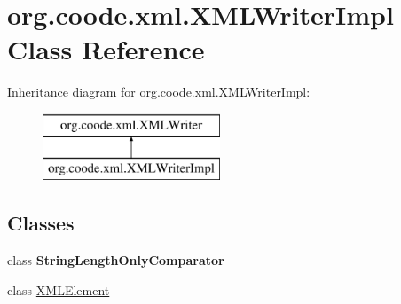 \hypertarget{classorg_1_1coode_1_1xml_1_1_x_m_l_writer_impl}{\section{org.\-coode.\-xml.\-X\-M\-L\-Writer\-Impl Class Reference}
\label{classorg_1_1coode_1_1xml_1_1_x_m_l_writer_impl}
}
Inheritance diagram for org.\-coode.\-xml.\-X\-M\-L\-Writer\-Impl\-:\begin{figure}[H]
\begin{center}
\leavevmode
\includegraphics[height=2.000000cm]{classorg_1_1coode_1_1xml_1_1_x_m_l_writer_impl}
\end{center}
\end{figure}
\subsection*{Classes}
\begin{DoxyCompactItemize}
\item 
class {\bfseries String\-Length\-Only\-Comparator}
\item 
class \hyperlink{classorg_1_1coode_1_1xml_1_1_x_m_l_writer_impl_1_1_x_m_l_element}{X\-M\-L\-Element}
\end{DoxyCompactItemize}
